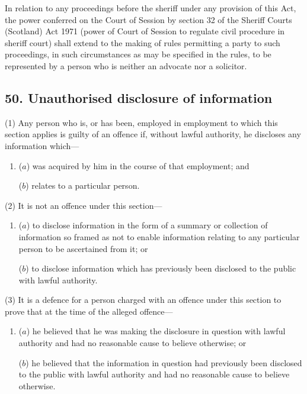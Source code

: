 \documentclass[12pt,a4paper]{article}
\begin{document}
In relation to any proceedings before the sheriff under any provision of this Act, the power conferred on the Court of Session by section 32 of the Sheriff Courts (Scotland) Act 1971 (power of Court of Session to regulate civil procedure in sheriff court) shall extend to the making of rules permitting a party to such proceedings, in such circumstances as may be specified in the rules, to be represented by a person who is neither an advocate nor a solicitor.


\subsection{50. Unauthorised disclosure of information}

(1) Any person who is, or has been, employed in employment to which this section applies is guilty of an offence if, without lawful authority, he discloses any information which—
\begin{enumerate}\item[]
($a$) was acquired by him in the course of that employment; and

($b$) relates to a particular person.
\end{enumerate}

(2) It is not an offence under this section—
\begin{enumerate}\item[]
($a$) to disclose information in the form of a summary or collection of information so framed as not to enable information relating to any particular person to be ascertained from it; or

($b$) to disclose information which has previously been disclosed to the public with lawful authority.
\end{enumerate}

(3) It is a defence for a person charged with an offence under this section to prove that at the time of the alleged offence—
\begin{enumerate}\item[]
($a$) he believed that he was making the disclosure in question with lawful authority and had no reasonable cause to believe otherwise; or

($b$) he believed that the information in question had previously been disclosed to the public with lawful authority and had no reasonable cause to believe otherwise.
\end{enumerate}
\end{document}
